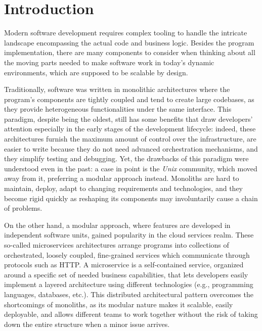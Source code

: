 \chapter{Introduction}
\label{chap:introduction}
Modern software development requires complex tooling to handle
the intricate landscape encompassing the actual code and business logic.
Besides the program implementation, there are many components to consider
when thinking about all the moving parts needed to make software work
in today's dynamic environments, which are supposed to be scalable by design.

Traditionally, software was written in monolithic architectures where
the program's components are tightly coupled and tend to create
large codebases, as they provide heterogeneous functionalities under the same interface.
This paradigm, despite being the oldest, still has some benefits that
draw developers' attention especially in the early stages of the development lifecycle:
indeed, these architectures furnish the maximum amount of control over the infrastructure,
are easier to write because they do not need advanced orchestration mechanisms,
and they simplify testing and debugging.
Yet, the drawbacks of this paradigm were understood even in the past:
a case in point is the \textit{Unix} community, which moved away from it,
preferring a modular approach instead. Monoliths are hard to maintain, deploy,
adapt to changing requirements and technologies, and they
become rigid quickly as reshaping its components may involuntarily cause a chain of problems.

On the other hand, a modular approach, where features are developed in
independent software units, gained popularity in the cloud services realm.
These so-called microservices architectures arrange
programs into collections of orchestrated, loosely coupled, fine-grained services
which communicate through protocols such as HTTP.
A microservice is a self-contained service, organized around a specific set
of needed business capabilities, that lets developers easily implement a layered architecture
using different technologies (e.g., programming languages, databases, etc.).
This distributed architectural pattern overcomes the shortcomings of monoliths,
as its modular nature makes it scalable, easily deployable, and allows different teams
to work together without the risk of taking down the entire structure when a minor issue arrives.

